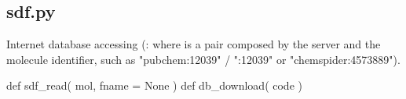 \normalsize
\subsection[sdf]{sdf.py}
Internet database accessing (: where  is a pair composed by the server and the molecule
identifier, such as "pubchem:12039" / ":12039" or "chemspider:4573889").
\begin{pyglist}[language=python,fvset={frame=single}]
def sdf_read( mol, fname = None )
def db_download( code )
\end{pyglist}
